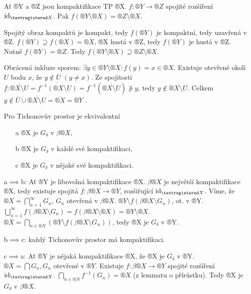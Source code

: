 \documentclass[12pt]{article}					%
\begin{document}
    \begin{lemma}
        Ať ®Y a ®Z jsou kompaktifikace TP ®X. $f: ®Y \rightarrow ®Z$ spojité rozšíření $\id_{®X}$. Pak $f(®Y \setminus ®X) = ®Z \setminus ®X$.

        \begin{dukazin}
            Spojitý obraz kompaktů je kompakt, tedy $f(®Y)$ je kompaktní, tedy uzavřená v ®Z. $f(®Y) \supseteq f(®X) = ®X$, ®X hustá v ®Z, tedy $f(®Y)$ je hustá v ®Z. Nutně $f(®Y) = ®Z$. Tedy $f(®Y \setminus ®X) \supseteq ®Z \setminus ®X$.

            Obrácená inkluze sporem: $\exists y \in ®Y \setminus ®X: f(y) = x \in ®X$. Existuje otevřené okolí $U$ bodu $x$, že $y \notin \overline{U}$ $(y ≠ x)$. Ze spojitosti $f: \overline{®X \setminus U} = \overline{f^{-1}(®X \setminus U)} = f^{-1}(\overline{®X \setminus U}) \not\ni y$, tedy $y \notin \overline{®X \setminus U}$. Celkem $y \notin \overline{U} \cup \overline{®X \setminus U} = \overline{®X} = ®Y$ \lightning.
        \end{dukazin}
    \end{lemma}

    \begin{tvrzeni}
        Pro Tichonovův prostor je ekvivalentní

        \begin{itemize}
            \item[a] ®X je $G_\delta$ v $\beta®X$,
            \item[b] ®X je $G_\delta$ v každé své kompaktifikaci,
            \item[c] ®X je $G_\delta$ v nějaké své kompaktifikaci.
        \end{itemize}
        
        \begin{dukazin}
            a$\implies$b: Ať ®Y je libovolná kompaktifikace ®X. $\beta®X$ je největší kompaktifikace ®X, tedy existuje spojitá $f: \beta®X \rightarrow ®Y$, rozšiřující $\id_{®X}$. Víme, že $®X = \bigcap_{n=1}^∞ G_n$, $G_n$ otevřená v $\beta®X$. $®Y \setminus f (\beta®X\setminus G_n)$, ot. v ®Y. $\bigcup_{n=1}^∞ f(\beta®X\setminus G_n) = f(\beta®X \setminus ®X) = ®Y \setminus ®X$. $®X = \bigcap_{n \in ®N} (®Y \setminus f(\beta®X \setminus G_n))$, tedy ®X je $G_\delta$ v ®Y.

            b$\implies$c: každý Tichonovův prostor má kompaktifikaci.

            c$\implies$a: Ať ®Y je nějaká kompaktifikace ®X, že ®X je $G_\delta$ v ®Y. $®X = \bigcap G_n, G_n \text{ otevřené v }®Y$. Existuje $f: \beta®X \rightarrow ®Y$ spojité rozšíření $\id_{®X}$. $\bigcap_{n \in ®N}f^{-1}(G_n) = ®X$ (z lemmatu o přírůstku). Tedy ®X je $G_\delta$ v $\beta®X$.
        \end{dukazin}
    \end{tvrzeni}
\end{document}
